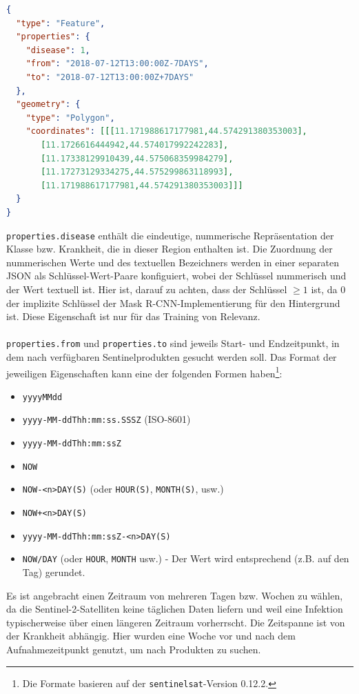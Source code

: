 \begin{lstlisting}[language=json,caption={Annotation},captionpos=b]
{
  "type": "Feature",
  "properties": {
    "disease": 1,
    "from": "2018-07-12T13:00:00Z-7DAYS",
    "to": "2018-07-12T13:00:00Z+7DAYS"
  },
  "geometry": {
    "type": "Polygon",
    "coordinates": [[[11.171988617177981,44.574291380353003],
       [11.1726616444942,44.574017992242283],
       [11.17338129910439,44.575068359984279],
       [11.17273129334275,44.575299863118993],
       [11.171988617177981,44.574291380353003]]]
  }
}
\end{lstlisting}
\noindent
\texttt{properties.disease} enthält die eindeutige, nummerische Repräsentation der Klasse bzw. Krankheit, die in dieser Region enthalten ist. Die Zuordnung der nummerischen Werte und des textuellen Bezeichners werden in einer separaten JSON als Schlüssel-Wert-Paare konfiguiert, wobei der Schlüssel nummerisch und der Wert textuell ist. Hier ist, darauf zu achten, dass der Schlüssel $\ge1$ ist, da $0$ der implizite Schlüssel der Mask R-CNN-Implementierung für den Hintergrund ist. Diese Eigenschaft ist nur für das Training von Relevanz.
\\\\
\texttt{properties.from} und \texttt{properties.to} sind jeweils Start- und Endzeitpunkt, in dem nach verfügbaren Sentinelprodukten gesucht werden soll. Das Format der jeweiligen Eigenschaften kann eine der folgenden Formen haben\footnote{Die Formate basieren auf der \texttt{sentinelsat}-Version 0.12.2.}:
\begin{itemize}
	\item \texttt{yyyyMMdd}
	\item \texttt{yyyy-MM-ddThh:mm:ss.SSSZ} (ISO-8601)
	\item \texttt{yyyy-MM-ddThh:mm:ssZ}
	\item \texttt{NOW}
	\item \texttt{NOW-<n>DAY(S)} (oder \texttt{HOUR(S)}, \texttt{MONTH(S)}, usw.)
	\item \texttt{NOW+<n>DAY(S)}
	\item \texttt{yyyy-MM-ddThh:mm:ssZ-<n>DAY(S)}
	\item \texttt{NOW/DAY} (oder \texttt{HOUR}, \texttt{MONTH} usw.) - Der Wert wird entsprechend (z.B. auf den Tag) gerundet.
\end{itemize}
\noindent
Es ist angebracht einen Zeitraum von mehreren Tagen bzw. Wochen zu wählen, da die Sentinel-2-Satelliten keine täglichen Daten liefern und weil eine Infektion typischerweise über einen längeren Zeitraum vorherrscht. Die Zeitspanne ist von der Krankheit abhängig. Hier wurden eine Woche vor und nach dem Aufnahmezeitpunkt genutzt, um nach Produkten zu suchen.


